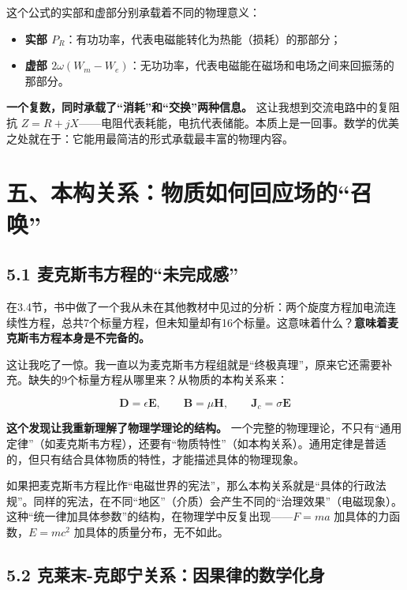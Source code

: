 \documentclass[12pt,a4paper]{ctexart}
\begin{document}
这个公式的实部和虚部分别承载着不同的物理意义：

\begin{itemize}
\item \textbf{实部 $P_R$}：有功功率，代表电磁能转化为热能（损耗）的那部分；
\item \textbf{虚部 $2\omega(W_m - W_e)$}：无功功率，代表电磁能在磁场和电场之间来回振荡的那部分。
\end{itemize}

\textbf{一个复数，同时承载了“消耗”和“交换”两种信息。} 这让我想到交流电路中的复阻抗 $Z = R + jX$——电阻代表耗能，电抗代表储能。本质上是一回事。数学的优美之处就在于：它能用最简洁的形式承载最丰富的物理内容。

\section*{五、本构关系：物质如何回应场的“召唤”}

\subsection*{5.1 麦克斯韦方程的“未完成感”}

在3.4节，书中做了一个我从未在其他教材中见过的分析：两个旋度方程加电流连续性方程，总共7个标量方程，但未知量却有16个标量。这意味着什么？\textbf{意味着麦克斯韦方程本身是不完备的。}

这让我吃了一惊。我一直以为麦克斯韦方程组就是“终极真理”，原来它还需要补充。缺失的9个标量方程从哪里来？从物质的本构关系来：

\begin{equation}
\mathbf{D} = \epsilon \mathbf{E}, \qquad
\mathbf{B} = \mu \mathbf{H}, \qquad
\mathbf{J}_c = \sigma \mathbf{E}
\end{equation}

\textbf{这个发现让我重新理解了物理学理论的结构。} 一个完整的物理理论，不只有“通用定律”（如麦克斯韦方程），还要有“物质特性”（如本构关系）。通用定律是普适的，但只有结合具体物质的特性，才能描述具体的物理现象。

如果把麦克斯韦方程比作“电磁世界的宪法”，那么本构关系就是“具体的行政法规”。同样的宪法，在不同“地区”（介质）会产生不同的“治理效果”（电磁现象）。这种“统一律加具体参数”的结构，在物理学中反复出现——$F=ma$ 加具体的力函数，$E=mc^2$ 加具体的质量分布，无不如此。

\subsection*{5.2 克莱末-克郎宁关系：因果律的数学化身}
\end{document}
